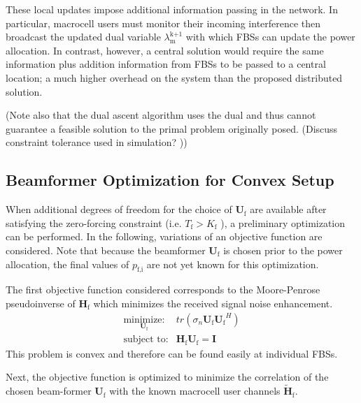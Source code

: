\documentclass[12pt,a4paper]{report}
\begin{document}
These local updates impose additional information passing in the network. In particular, macrocell users must monitor their incoming interference then broadcast the updated dual variable $\lambda_{\text{m}}^{\text{k+1}}$ with which FBSs can update the power allocation. In contrast, however, a central solution would require the same information plus addition information from FBSs to be passed to a central location; a much higher overhead on the system than the proposed distributed solution. 

(Note also that the dual ascent algorithm uses the dual and thus cannot guarantee a feasible solution to the primal problem originally posed. (Discuss constraint tolerance used in simulation? ))

\subsection{Beamformer Optimization for Convex Setup}
When additional degrees of freedom for the choice of $\mathbf{U}_{\mathrm{f}}$ are available after satisfying the zero-forcing constraint (i.e. $T_{\text{f}}> K_{\text{f}}$ ), a preliminary optimization can be performed. In the following, variations of an objective function are considered. Note that because the beamformer $\mathbf{U}_{\mathrm{f}}$ is chosen prior to the power allocation, the final values of $p_{\text{f,i}}$ are not yet known for this optimization. 
\par
The first objective function considered corresponds to the Moore-Penrose pseudoinverse of $\mathbf{H}_{\text{f}}$ which minimizes the received signal noise enhancement. 
    \begin{equation}
    \begin{array}{ll}
    \underset{\mathbf{U}_{\mathrm{f}} }{\text{minimize:}}   & tr(\sigma_n\mathbf{U_{\mathrm{f}}}  \mathbf{U_{\mathrm{f}}}^H)
    \\
    \mbox{subject to:} & \mathbf{H}_{\mathrm{f}}  \mathbf{U_{\mathrm{f}}} = \mathbf{I}
    \end{array}
    \label{e-opt-prob}
    \end{equation}
    This problem is convex and therefore can be found easily at individual FBSs. 

    \par
Next, the objective function is optimized to minimize the correlation of the chosen beam-former $\mathbf{U}_{\mathrm{f}}$ with the known macrocell user channels $\mathbf{\tilde{H}}_{\mathrm{f}}$.
\end{document}
